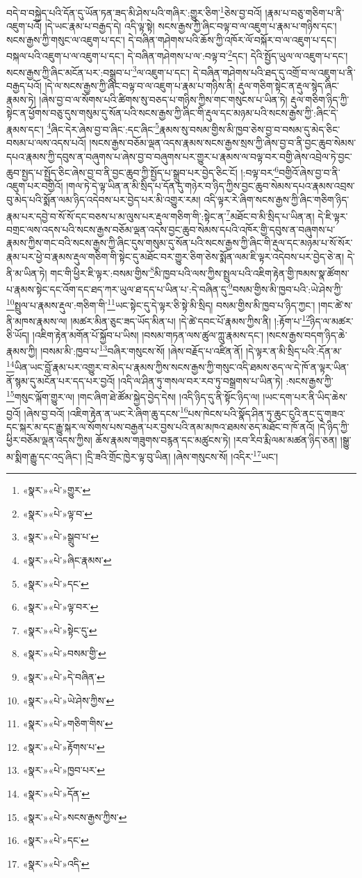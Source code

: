 བདེ་བ་བསྐྱེད་པའི་དོན་དུ་ཡོན་ཏན་ཟད་མི་ཤེས་པའི་གཞིར་:གྱུར་ཅིག་\footnote{«སྣར་»«པེ་»གྱུར་}ཅེས་བྱ་བའོ། །རྣམ་པ་བཅུ་གཅིག་པ་ནི་འཇུག་པའོ། །དེ་ཡང་རྣམ་པ་བརྒྱད་དེ། འདི་ལྟ་སྟེ། སངས་རྒྱས་ཀྱི་ཞིང་བལྟ་བ་ལ་འཇུག་པ་རྣམ་པ་གཉིས་དང་། སངས་རྒྱས་ཀྱི་གསུང་ལ་འཇུག་པ་དང་། དེ་བཞིན་གཤེགས་པའི་ཆོས་ཀྱི་འཁོར་ལོ་བསྐོར་བ་ལ་འཇུག་པ་དང་། བསྐལ་པའི་འཇུག་པ་ལ་འཇུག་པ་དང་། དེ་བཞིན་གཤེགས་པ་ལ་:བལྟ་བ་\footnote{«སྣར་»«པེ་»ལྟ་བ་}དང་། དེའི་སྤྱོད་ཡུལ་ལ་འཇུག་པ་དང་། སངས་རྒྱས་ཀྱི་ཞིང་མངོན་པར་:བསྒྲུབ་པ་\footnote{«སྣར་»«པེ་»སྒྲུབ་པ་}ལ་འཇུག་པ་དང་། དེ་བཞིན་གཤེགས་པའི་ཐད་དུ་འགྲོ་བ་ལ་འཇུག་པ་ནི་བརྒྱད་པའོ། །དེ་ལ་སངས་རྒྱས་ཀྱི་ཞིང་བལྟ་བ་ལ་འཇུག་པ་རྣམ་པ་གཉིས་ནི། རྡུལ་གཅིག་སྟེང་ན་རྡུལ་སྙེད་ཞིང་རྣམས་ཏེ། །ཞེས་བྱ་བ་ལ་སོགས་པའི་ཚིགས་སུ་བཅད་པ་གཉིས་ཀྱིས་གང་གསུངས་པ་ཡིན་ཏེ། རྡུལ་གཅིག་ཉིད་ཀྱི་སྟེང་ན་ཕྱོགས་བཅུ་དུས་གསུམ་དུ་སོན་པའི་སངས་རྒྱས་ཀྱི་ཞིང་གི་རྡུལ་དང་མཉམ་པའི་སངས་རྒྱས་ཀྱི་:ཞིང་དེ་རྣམས་དང་། \footnote{«སྣར་»«པེ་»ཞིང་རྣམས་}ཞིང་དེར་ཞེས་བྱ་བ་ཞིང་:དང་ཞིང་\footnote{«སྣར་»«པེ་»དང་}རྣམས་སུ་བསམ་གྱིས་མི་ཁྱབ་ཅེས་བྱ་བ་བསམ་དུ་མེད་ཅིང་བསམ་པ་ལས་འདས་པའོ། །སངས་རྒྱས་བཅོམ་ལྡན་འདས་རྣམས་སངས་རྒྱས་སྲས་ཀྱི་ཞེས་བྱ་བ་ནི་བྱང་ཆུབ་སེམས་དཔའ་རྣམས་ཀྱི་དབུས་ན་བཞུགས་པ་ཞེས་བྱ་བ་བཞུགས་པར་གྱུར་པ་རྣམས་ལ་བལྟ་བར་བགྱི་ཞེས་འབྲེལ་ཏེ་བྱང་ཆུབ་སྤྱད་པ་སྤྱོད་ཅིང་ཞེས་བྱ་བ་ནི་བྱང་ཆུབ་ཀྱི་སྤྱོད་པ་སྒྲུབ་པར་བྱེད་ཅིང་ངོ། །:བལྟ་བར་\footnote{«སྣར་»«པེ་»ལྟ་བར་}བགྱིའོ་ཞེས་བྱ་བ་ནི་འཇུག་པར་བགྱིའོ། །གལ་ཏེ་དེ་ལྟ་ཡིན་ན་མི་སྲིད་པ་དོན་དུ་གཉེར་བ་ཉིད་ཀྱིས་བྱང་ཆུབ་སེམས་དཔའ་རྣམས་འབྲས་བུ་མེད་པའི་སྨོན་ལམ་ཉིད་འདེབས་པར་བྱེད་པར་མི་འགྱུར་རམ། འདི་ལྟར་རེ་ཞིག་སངས་རྒྱས་ཀྱི་ཞིང་གཅིག་ཉིད་རྣམ་པར་དབྱེ་བ་སོ་སོ་དང་བཅས་པ་མ་ལུས་པར་རྡུལ་གཅིག་གི་:སྟེང་ན་\footnote{«སྣར་»«པེ་»སྟེང་དུ་}མཐོང་བ་མི་སྲིད་པ་ཡིན་ན། དེ་ཇི་ལྟར་བགྲང་ལས་འདས་པའི་སངས་རྒྱས་བཅོམ་ལྡན་འདས་བྱང་ཆུབ་སེམས་དཔའི་འཁོར་གྱི་དབུས་ན་བཞུགས་པ་རྣམས་ཀྱིས་གང་བའི་སངས་རྒྱས་ཀྱི་ཞིང་དུས་གསུམ་དུ་སོན་པའི་སངས་རྒྱས་ཀྱི་ཞིང་གི་རྡུལ་དང་མཉམ་པ་སོ་སོར་རྣམ་པར་ཕྱེ་བ་རྣམས་རྡུལ་གཅིག་གི་སྟེང་དུ་མཐོང་བར་གྱུར་ཅིག་ཅེས་སྨོན་ལམ་ཇི་ལྟར་འདེབས་པར་བྱེད་ཅེ་ན། དེ་ནི་མ་ཡིན་ཏེ། གང་གི་ཕྱིར་ཇི་ལྟར་:བསམ་གྱིས་\footnote{«སྣར་»«པེ་»བསམ་གྱི་}མི་ཁྱབ་པའི་ལས་ཀྱིས་སྤྲུལ་པའི་འཇིག་རྟེན་གྱི་ཁམས་སྣ་ཚོགས་པ་རྣམས་སྟེང་དང་འོག་དང་ཐད་ཀར་ཡུལ་ཐ་དད་པ་ཡིན་པ་:དེ་བཞིན་དུ་\footnote{«སྣར་»«པེ་»དེ་བཞིན་}བསམ་གྱིས་མི་ཁྱབ་པའི་:ཡེ་ཤེས་ཀྱི་\footnote{«སྣར་»«པེ་»ཡེ་ཤེས་ཀྱིས་}སྤྲུལ་པ་རྣམས་རྡུལ་:གཅིག་གི་\footnote{«སྣར་»«པེ་»གཅིག་གིས་}ཡང་སྟེང་དུ་དེ་ལྟར་ཅི་སྟེ་མི་སྲིད། བསམ་གྱིས་མི་ཁྱབ་པ་ཉིད་ཀྱང་། །གང་ཚེ་ས་ནི་མཁས་རྣམས་ལ། །མཚར་མིན་ཅུང་ཟད་ཡོད་མིན་པ། །དེ་ཚེ་དབང་པོ་རྣམས་ཀྱིས་ནི། །:རྟོག་པ་\footnote{«སྣར་»«པེ་»རྟོགས་པ་}ཉིད་ལ་མཚར་ཅི་ཡོད། །འཇིག་རྟེན་མགོན་པོ་སྐྱོབ་པ་ཡིས། །བསམ་གཏན་ལས་ཚུལ་ཀླུ་རྣམས་དང་། །སངས་རྒྱས་བདག་ཉིད་ཆེ་རྣམས་ཀྱི། །བསམ་མི་:ཁྱབ་པ་\footnote{«སྣར་»«པེ་»ཁྱབ་པར་}བཞིར་གསུངས་སོ། །ཞེས་བརྗོད་པ་འཛིན་ནོ། །དེ་ལྟར་ན་མི་སྲིད་པའི་:དོན་མ་\footnote{«སྣར་»«པེ་»དོན་}ཡིན་ཡང་བློ་རྣམ་པར་འགྱུར་བ་མེད་པ་རྣམས་ཀྱིས་སངས་རྒྱས་ཀྱི་གསུང་འདི་ཐམས་ཅད་ལ་དེ་ཁོ་ན་ལྟར་ཡིན་ནོ་སྙམ་དུ་མངོན་པར་དད་པར་བྱའོ། །འདི་ལ་ཤིན་ཏུ་གསལ་བར་རབ་ཏུ་བསྒྲགས་པ་ཡིན་ཏེ། :སངས་རྒྱས་ཀྱི་\footnote{«སྣར་»«པེ་»སངས་རྒྱས་ཀྱིས་}གསུང་ལྐོག་གྱུར་ལ། །གང་ཞིག་ཐེ་ཚོམ་སྐྱེད་བྱེད་དེས། །འདི་ཉིད་དུ་ནི་སྟོང་ཉིད་ལ། །ཡང་དག་པར་ནི་ཡིད་ཆེས་བྱའོ། །ཞེས་བྱ་བའོ། །འཇིག་རྟེན་ན་ཡང་རེ་ཞིག་ཆུ་དངས་\footnote{«སྣར་»«པེ་»དང་}པས་ཁེངས་པའི་སྣོད་ཤིན་ཏུ་ཆུང་ངུའི་ནང་དུ་གཟའ་དང་སྐར་མ་དང་རྒྱུ་སྐར་ལ་སོགས་པས་བརྒྱན་པར་བྱས་པའི་ནམ་མཁའ་ཐམས་ཅད་མཐོང་བ་ཁོ་ནའོ། །དེ་ཉིད་ཀྱི་ཕྱིར་བཅོམ་ལྡན་འདས་ཀྱིས། ཆོས་རྣམས་གཟུགས་བརྙན་དང་མཚུངས་ཏེ། །རབ་རིབ་རྨི་ལམ་མཚན་ཉིད་ཅན། །སྒྱུ་མ་སྨིག་རྒྱུ་དང་འདྲ་ཞིང་། །དྲི་ཟའི་གྲོང་ཁྱེར་ལྟ་བུ་ཡིན། །ཞེས་གསུངས་སོ། །འདིར་\footnote{«སྣར་»«པེ་»འདི་}ཡང་། 